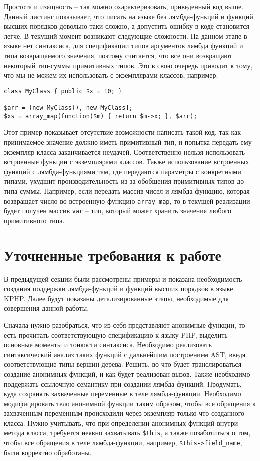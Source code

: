 Простота и изящность -- так можно охарактеризовать, приведенный код выше.
Данный листинг показывает, что писать на языке без лямбда-функций и функций высших порядков довольно-таки сложно, а допустить ошибку в коде становится легче.
В текущий момент возникают следующие сложности.
На данном этапе в языке нет синтаксиса, для спецификации типов аргументов лямбда функций и типа возвращаемого значения, поэтому считается, что все они возвращают некоторый тип-суммы примитивных типов.
Это в свою очередь приводит к тому, что мы не можем их использовать с экземплярами классов, например:
\begin{lstlisting}
class MyClass { public $x = 10; }

$arr = [new MyClass(), new MyClass];
$xs = array_map(function($m) { return $m->x; }, $arr);
\end{lstlisting}

Этот пример показывает отсутствие возможности написать такой код, так как принимаемое значение должно иметь примитивный тип, и попытка передать ему экземпляр класса заканчивается неудачей.
Соответственно нельзя использовать встроенные функции с экземплярами классов.
Также использование встроенных функций с лямбда-функциями там, где передаются параметры с конкретными типами, ухудшит производительность из-за обобщения примитивных типов до типа-суммы.
Например, если передать массив чисел и лямбда-функцию, которая возвращает число во встроенную функцию \verb|array_map|, то в текущей реализации будет получен массив \verb|var| -- тип, который может хранить значения любого примитивного типа.
\finishrelatedwork

\section{Уточненные требования к работе}
В предыдущей секции были рассмотрены примеры и показана необходимость создания поддержки лямбда-функций и функций высших порядков в языке KPHP.
Далее будут показаны детализированные этапы, необходимые для совершения данной работы.

Сначала нужно разобраться, что из себя представляют анонимные функции, то есть прочитать соответствующую спецификацию к языку PHP, выделить основные моменты и тонкости синтаксиса.
Необходимо реализовать синтаксический анализ таких функций с дальнейшим построением AST, введя соответствующие типы вершин дерева.
Решить, во что будет транслироваться создание анонимных функций, и как будет реализован вызов.
Также необходимо поддержать ссылочную семантику при создании лямбда-функций.
Продумать, куда сохранять захваченные переменные в теле лямбда-функции.
Необходимо модифицировать тело анонимной функции таким образом, чтобы все обращения к захваченным переменным происходили через экземпляр только что созданного класса.
Нужно учитывать, что при определении анонимных функций внутри метода класса, требуется неявно захватывать \verb|$this|, а также позаботиться о том, чтобы все обращения в теле лямбда-функции, например, \verb|$this->field_name|, были корректно обработаны.

